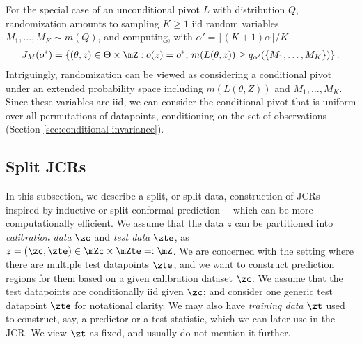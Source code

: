 \documentclass[english]{article}
\begin{document}
For the special case of an unconditional pivot $L$ with distribution $Q$,
randomization amounts to sampling 
$K\ge1 $ iid random variables $M_1,\ldots, M_K\sim m(Q)$, and computing, with  $\alpha' = \lfloor (K + 1)\alpha\rfloor/K$
\begin{align*}%
    J_M(o^*)= \left\{(\theta,z) 
\in\Theta\times\mZ: 
o(z) = o^*,\,
m(L(\theta,z)) \ge q_{\alpha'}(\{M_1,\ldots, M_K\}) \right\}.
\end{align*}
Intriguingly, randomization 
can be viewed as considering a conditional pivot under an extended probability space including $m(L(\theta,Z))$ and $M_1,\ldots, M_K$.
Since these variables are iid, 
we can consider the  conditional pivot that is uniform over all permutations of datapoints, conditioning on the set of observations (Section \ref{sec:conditional-invariance}). 




\subsection{Split JCRs}\label{sec:split-JCR}
In this subsection, we describe a split, or split-data,  construction of JCRs---inspired by inductive or split conformal prediction \citep{papadopoulos2002inductive}---which can be more computationally efficient. 
We assume that the data 
$z$ can be partitioned into
\emph{calibration data} $\zc$
and \emph{test data} $\zte$, 
as 
$z = (\zc, \zte) \in \mZc \times \mZte =:\mZ$. 
We are concerned with the setting where there are multiple test datapoints $\zte$, 
and we want to construct prediction regions for them based on a given calibration dataset $\zc$.
We assume that the test datapoints are conditionally iid given $\zc$; and consider one generic test datapoint $\zte$ for notational clarity.
We may also have  \emph{training data} $\zt$ used to construct, say, a predictor or a test statistic, which we can later use in the JCR. 
We view $\zt$ as fixed, and usually do not mention it further.
\end{document}

